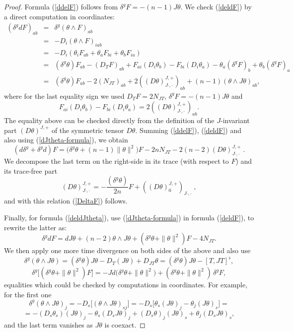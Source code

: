 \documentclass[10pt,a4paper]{amsart}
\begin{document}
\begin{proof} 
Formula (\ref{ddelF}) follows from
$\delta^g F = -(n-1) J \theta $. We check (\ref{deldF}) by a direct computation in coordinates:
\begin{eqnarray*}
 (\delta^g d  F)_{ab} &=& \delta^g (\theta \wedge F)_{ab}\\
 &=& - D_i (\theta \wedge F)_{iab}\\ 
 &=& -D_i ( \theta_i F_{ab} + \theta_a F_{bi} + \theta_b F_{ia})\\
 &=& (\delta^g \theta) F_{ab} - (D_TF)_{ab} + F_{ai} (D_i \theta_b) - F_{bi} (D_i \theta_a) - \theta_a (\delta^g F)_b + \theta_b (\delta^g F)_a \\
 &=& (\delta^g \theta) F_{ab} - 2(N_{JT})_{ab} + 2 ((D \theta)^{J,+}_{J\cdot,\cdot})_{ab} + (n-1) (\theta \wedge J \theta)_{ab},
 \end{eqnarray*}
where for the last equality sign we used $D_T F = 2N_{JT}$, $\delta^g F = -(n-1) J \theta $ and
$$ F_{ai} (D_i \theta_b) - F_{bi} (D_i \theta_a) = 2 ((D \theta)^{J,+}_{J\cdot,\cdot})_{ab}. $$
The equality above can be checked directly from the definition of the $J$-invariant part
$(D \theta)^{J,+}$ of the symmetric tensor $D \theta$. Summing (\ref{ddelF}), (\ref{deldF}) and also using (\ref{dJtheta-formula}), we obtain
$$ (d \delta^g + \delta^g d)  F = \big( \delta^g \theta + (n-1)\|\theta\|^2 \big) F - 2n N_{JT} - 2(n-2) (D \theta)^{J,+}_{J\cdot,\cdot} \; .$$
We decompose the last term on the right-side in its trace (with respect to $F$) and its trace-free part
$$ (D \theta)^{J,+}_{J\cdot,\cdot} = -\frac{(\delta^g \theta)}{2n} F + ((D \theta)^{J,+}_0)_{J\cdot,\cdot} \; , $$
and with this relation (\ref{DeltaF}) follows.



Finally, for formula (\ref{deldJtheta}), use (\ref{dJtheta-formula}) in formula (\ref{deldF}), to rewrite the latter as:
$$ \delta^g d  F = dJ \theta +(n-2) \theta \wedge J\theta + ( \delta^g \theta + \| \theta \|^2) F - 4N_{JT}.$$
We then apply one more time divergence on both sides of the above and also use
$$\delta^g (\theta \wedge J \theta) = (\delta^g \theta) J\theta - D_T (J\theta) + D_{JT} \theta  = (\delta^g \theta) J\theta - [T, JT]^{\flat},$$
$$ \delta^g \big[ (\delta^g \theta +\|\theta \|^2) F \big] = - J d\big( \delta^g \theta + \|\theta \|^2 \big) + (\delta^g \theta + \|\theta\|^2) \, \delta^g F,$$
equalities which could be checked by computations in coordinates. For example, for the first one
$$\delta^g (\theta \wedge J \theta)_j = - D_s \big[ (\theta \wedge J\theta)_{sj}\big] = - D_s \big[ \theta_s (J\theta)_j - \theta_j (J\theta)_s \big] =$$
$$ = -(D_s \theta_s) (J\theta)_j - \theta_s (D_s J\theta)_j + (D_s \theta)_j (J\theta)_s + \theta_j (D_s J\theta)_s ,$$
and the last term vanishes as $J\theta $ is coexact. 
\end{proof}
\end{document}
